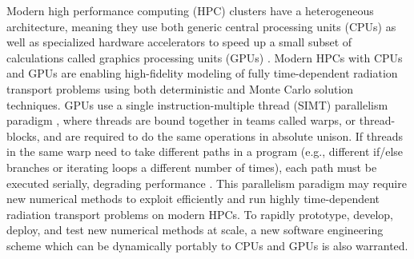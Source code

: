 Modern high performance computing (HPC) clusters have a heterogeneous architecture, meaning they use both generic central processing units (CPUs) as well as specialized hardware accelerators to speed up a small subset of calculations called graphics processing units (GPUs) \cite{niemeyer_phd}.
Modern HPCs with CPUs and GPUs are enabling high-fidelity modeling of fully time-dependent radiation transport problems using both deterministic and Monte Carlo solution techniques.
GPUs use a single instruction-multiple thread (SIMT) parallelism paradigm \cite{cuda}, where threads are bound together in teams called warps, or thread-blocks, and are required to do the same operations in absolute unison. 
If threads in the same warp need to take different paths in a program (e.g., different if/else branches or iterating loops a different number of times), each path must be executed serially, degrading performance \cite{braxton_phd}.
This parallelism paradigm may require new numerical methods to exploit efficiently and run highly time-dependent radiation transport problems on modern HPCs.
To rapidly prototype, develop, deploy, and test new numerical methods at scale, a new software engineering scheme which can be dynamically portably to CPUs and GPUs is also warranted.

